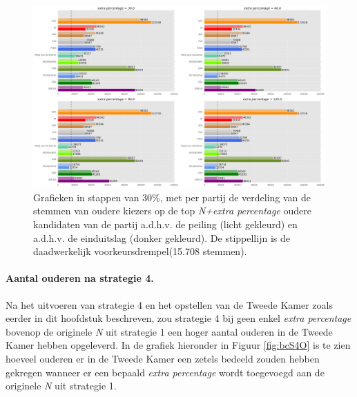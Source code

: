 \begin{figure}[H]

	\includegraphics[width=\linewidth]	{stemmen_op_ouderen_topNextrapercentage_samen.png}

			\caption{Grafieken in stappen van 30\%, met per partij de verdeling van de stemmen van oudere kiezers op de top \textit{N+extra percentage} oudere kandidaten van de partij a.d.h.v. de peiling (licht gekleurd) en a.d.h.v. de einduitslag (donker gekleurd). De stippellijn is de daadwerkelijk voorkeursdrempel(15.708 stemmen).} 

\label{fig:stemmenS4O}
\end{figure}





\paragraph{Aantal ouderen na strategie 4.}
Na het uitvoeren van strategie 4 en het opstellen van de Tweede Kamer zoals eerder in dit hoofdstuk beschreven, zou strategie 4 bij geen enkel \textit{extra percentage} bovenop de originele \textit{N} uit strategie 1 een hoger aantal ouderen in de Tweede Kamer hebben opgeleverd. In de grafiek hieronder in Figuur \ref{fig:bcS4O} is te zien hoeveel ouderen er in de Tweede Kamer een zetels bedeeld zouden hebben gekregen wanneer er een bepaald \textit{extra percentage} wordt toegevoegd aan de originele \textit{N} uit strategie 1.



